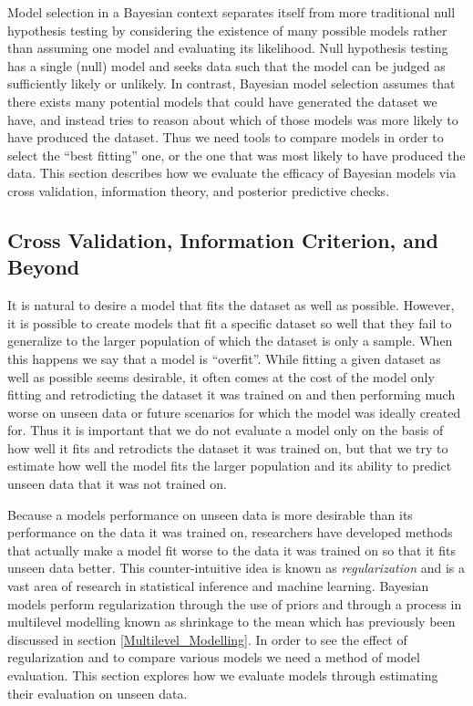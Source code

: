 Model selection in a Bayesian context separates itself from more traditional null hypothesis testing by considering the existence of many possible models rather than assuming one model and evaluating its likelihood. Null hypothesis testing has a single (null) model and seeks data such that the model can be judged as sufficiently likely or unlikely. In contrast, Bayesian model selection assumes that there exists many potential models that could have generated the dataset we have, and instead tries to reason about which of those models was more likely to have produced the dataset. Thus we need tools to compare models in order to select the ``best fitting'' one, or the one that was most likely to have produced the data. This section describes how we evaluate the efficacy of Bayesian models via cross validation, information theory, and posterior predictive checks.

\subsection*{Cross Validation, Information Criterion, and Beyond}
It is natural to desire a model that fits the dataset as well as possible. However, it is possible to create models that fit a specific dataset so well that they fail to generalize to the larger population of which the dataset is only a sample. When this happens we say that a model is ``overfit''. While fitting a given dataset as well as possible seems desirable, it often comes at the cost of the model only fitting and retrodicting the dataset it was trained on and then performing much worse on unseen data or future scenarios for which the model was ideally created for. Thus it is important that we do not evaluate a model only on the basis of how well it fits and retrodicts the dataset it was trained on, but that we try to estimate how well the model fits the larger population and its ability to predict unseen data that it was not trained on.

Because a models performance on unseen data is more desirable than its performance on the data it was trained on, researchers have developed methods that actually make a model fit worse to the data it was trained on so that it fits unseen data better. This counter-intuitive idea is known as \textit{regularization} and is a vast area of research in statistical inference and machine learning. Bayesian models perform regularization through the use of priors and through a process in multilevel modelling known as shrinkage to the mean which has previously been discussed in section \ref{Multilevel_Modelling}. In order to see the effect of regularization and to compare various models we need a method of model evaluation. This section explores how we evaluate models through estimating their evaluation on unseen data.

